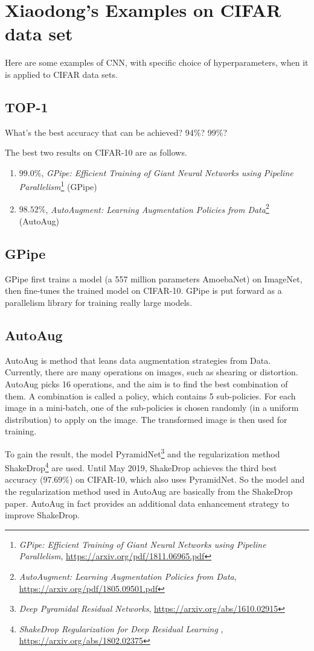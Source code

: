 \section{Xiaodong's Examples on CIFAR data set}
Here are some examples of CNN, with specific choice of hyperparameters, when it is applied to CIFAR data sets. 

\subsection{TOP-1}
What's the best accuracy that can be achieved?  94\%?  99\%?

The best two results on CIFAR-10 are as follows.
\begin{enumerate}
    \item $99.0\%$, \emph{GPipe: Efficient Training of Giant Neural Networks using Pipeline Parallelism}\footnote{\emph{GPipe: Efficient Training of Giant Neural Networks using Pipeline Parallelism}, \url{https://arxiv.org/pdf/1811.06965.pdf}} (GPipe)
    \item $98.52\%$, \emph{AutoAugment: Learning Augmentation Policies from Data}\footnote{\emph{AutoAugment: Learning Augmentation Policies from Data}, \url{https://arxiv.org/pdf/1805.09501.pdf}} (AutoAug)
\end{enumerate}

\subsection{GPipe}
GPipe first trains a model (a 557 million parameters AmoebaNet) on ImageNet, then fine-tunes the trained model on CIFAR-10. GPipe is put forward as a parallelism library for training really large models.

\subsection{AutoAug}
AutoAug is method that leans data augmentation strategies from Data. Currently, there are many operations on images, such as shearing or distortion. AutoAug picks 16 operations, and the aim is to find the best combination of them. A combination is called a policy, which contains 5 sub-policies. For each image in a mini-batch, one of the sub-policies is chosen randomly (in a uniform distribution) to apply on the image. The transformed image is then used for training.

To gain the result, the model PyramidNet\footnote{\emph{Deep Pyramidal Residual Networks}, \url{https://arxiv.org/abs/1610.02915}} and the regularization method ShakeDrop\footnote{\emph{ShakeDrop Regularization for Deep Residual Learning
}, \url{https://arxiv.org/abs/1802.02375}} are used.  
Until May 2019, ShakeDrop achieves the third best accuracy ($97.69\%$) on CIFAR-10, which also uses PyramidNet. So the model and the regularization method used in AutoAug are basically from the ShakeDrop paper. AutoAug in fact provides an additional data enhancement strategy to improve ShakeDrop.


